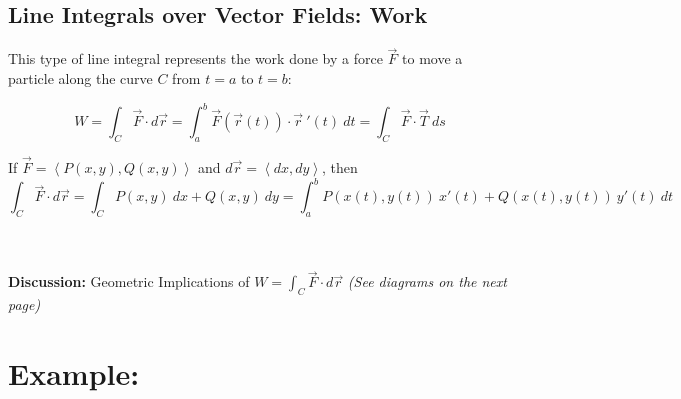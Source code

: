 
\vspace*{.1in}%

\subsection*{Line Integrals over Vector Fields: Work}
%
This type of line integral represents the work done by a force \(\vec{F}\) to move a particle along the curve \(C\) from \(t=a\) to \(t=b\):

\[
W=\int_C \vec{F}\cdot d\vec{r}  = \int_a^b \vec{F}(\vec{r}(t))\cdot \vec{r}\ '(t)\ dt  = \int_C \vec{F}\cdot \vec{T}\ ds
\]

If \(\vec{F} = \left\langle P(x,y), Q(x,y)\right\rangle\) and \(d\vec{r} = \left\langle dx, dy\right\rangle\), then 
\[
\int_C \vec{F}\cdot d\vec{r} = \int_C P(x,y)\ dx + Q(x,y)\ dy 
= \int_a^b P( x(t), y(t) )\ x'(t) + Q( x(t), y(t) )\ y'(t)\ dt
\]



~\\~\\
\textbf{Discussion:} Geometric Implications of \(W =\int_C \vec{F}\cdot d\vec{r}\) \hfill
\textit{(See diagrams on the next page)}



\vspace*{-.2in}
\section*{Example:}



